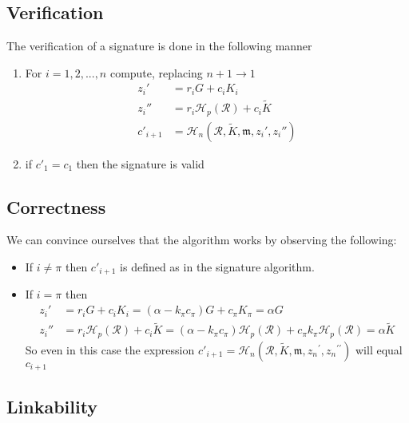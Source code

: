 \subsection*{Verification}

The verification of a signature is done in the following manner

\begin{enumerate}
	\item  For \(i = 1, 2, ..., n\) compute, replacing \(n + 1 \rightarrow 1\)
	\begin{align*}
	z_i'       &= r_i G + c_i {K_i} \\
	z_i''      & = r_i \mathcal{H}_p(\mathcal{R}) + c_i \tilde{K} \\
	c'_{i+1}   &= \mathcal{H}_n(\mathcal{R}, \tilde{K}, \mathfrak{m}, {z_i}', {z_i}'')
	\end{align*}
	
	\item if \(c'_1 = c_1\) then the signature is valid
\end{enumerate}



\subsection*{Correctness}

We can convince ourselves that the algorithm works by observing the following:

\begin{itemize}
	
	\item[]If \(i \ne \pi\) then \(c'_{i+1}\) is defined as in the signature algorithm.

	\item[] If \(i = \pi\) then 
	\begin{align*}
	   z_i'  &= r_i G + c_i K_i = (\alpha - k_\pi c_\pi) G + c_\pi K_\pi = \alpha G \\
	   z_i'' &= r_i \mathcal{H}_p(\mathcal{R}) + c_i \tilde{K} = (\alpha - k_\pi c_\pi) \mathcal{H}_p(\mathcal{R}) + c_\pi k_\pi \mathcal{H}_p(\mathcal{R}) =  \alpha \tilde{K}
    \end{align*}
    So even in this case the expression \(c'_{i+1} = \mathcal{H}_n(\mathcal{R}, \tilde{K}, \mathfrak{m}, {z_n}^\prime, {z_n}^{\prime\prime})\) will equal \(c_{i+1}\)
\end{itemize}


\subsection*{Linkability}


